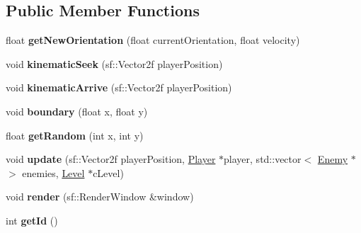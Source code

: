 \subsection*{Public Member Functions}
\begin{DoxyCompactItemize}
\item 
\mbox{\label{class_predator___ship_a2aca3f5e5b20cade0fa0b0fdc5dd2d5b}} 
float {\bfseries get\+New\+Orientation} (float current\+Orientation, float velocity)
\item 
\mbox{\label{class_predator___ship_a5d99c7962fcf761e25ccb649d320e275}} 
void {\bfseries kinematic\+Seek} (sf\+::\+Vector2f player\+Position)
\item 
\mbox{\label{class_predator___ship_a3278a4890635cad41502506e8d543f5a}} 
void {\bfseries kinematic\+Arrive} (sf\+::\+Vector2f player\+Position)
\item 
\mbox{\label{class_predator___ship_a5b52e918a2de3d02c594d22f855767b5}} 
void {\bfseries boundary} (float x, float y)
\item 
\mbox{\label{class_predator___ship_a34ebd4a3822d2218e5d6eb28944f9ce5}} 
float {\bfseries get\+Random} (int x, int y)
\item 
\mbox{\label{class_predator___ship_a9a8f721534b1e96f2bc27071f2dd80c5}} 
void {\bfseries update} (sf\+::\+Vector2f player\+Position, \mbox{\hyperlink{class_player}{Player}} $\ast$player, std\+::vector$<$ \mbox{\hyperlink{class_enemy}{Enemy}} $\ast$ $>$ enemies, \mbox{\hyperlink{class_level}{Level}} $\ast$c\+Level)
\item 
\mbox{\label{class_predator___ship_a8da57d46ee1127ad67c6304cfc83024e}} 
void {\bfseries render} (sf\+::\+Render\+Window \&window)
\item 
\mbox{\label{class_predator___ship_aa9bd97c27edf97caa6c5f7fceb950a30}} 
int {\bfseries get\+Id} ()
\item 
\mbox{\label{class_predator___ship_a5977666a735ee7535bbff99c19352620}} 

\end{DoxyCompactItemize}
